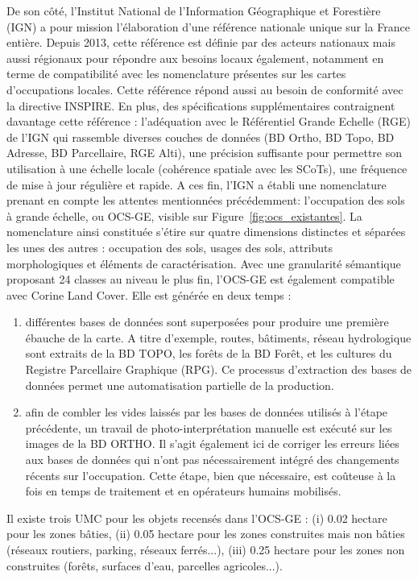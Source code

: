 De son côté, l'Institut National de l'Information Géographique et Forestière (IGN) a pour mission l'élaboration d'une référence nationale unique sur la France entière. Depuis 2013, cette référence est définie par des acteurs nationaux mais aussi régionaux pour répondre aux besoins locaux également, notamment en terme de compatibilité avec les nomenclature présentes sur les cartes d'occupations locales. Cette référence répond aussi au besoin de conformité avec la directive INSPIRE. En plus, des spécifications supplémentaires contraignent davantage cette référence : l'adéquation avec le Référentiel Grande Echelle (RGE) de l'IGN qui rassemble diverses couches de données (BD Ortho, BD Topo, BD Adresse, BD Parcellaire, RGE Alti), une précision suffisante pour permettre son utilisation à une échelle locale (cohérence spatiale avec les SCoTs), une fréquence de mise à jour régulière et rapide. A ces fin, l'IGN a établi une nomenclature prenant en compte les attentes mentionnées précédemment: l'occupation des sols à grande échelle, ou OCS-GE, visible sur Figure~\ref{fig:ocs_existantes}. La nomenclature ainsi constituée s'étire sur quatre dimensions distinctes et séparées les unes des autres : occupation des sols, usages des sols, attributs morphologiques et éléments de caractérisation. Avec une granularité sémantique proposant 24 classes au niveau le plus fin, l'OCS-GE est également compatible avec Corine Land Cover. Elle est générée en deux temps :
\begin{enumerate}
    \item différentes bases de données sont superposées pour produire une première ébauche de la carte. A titre d'exemple, routes, bâtiments, réseau hydrologique sont extraits de la BD TOPO\textregistered, les forêts de la BD Forêt\textregistered, et les cultures du Registre Parcellaire Graphique (RPG). Ce processus d'extraction des bases de données permet une automatisation partielle de la production.
    \item afin de combler les vides laissés par les bases de données utilisés à l'étape précédente, un travail de photo-interprétation manuelle est exécuté sur les images de la BD ORTHO\textregistered. Il s'agit également ici de corriger les erreurs liées aux bases de données qui n'ont pas nécessairement intégré des changements récents sur l'occupation. Cette étape, bien que nécessaire, est coûteuse à la fois en temps de traitement et en opérateurs humains mobilisés.
\end{enumerate}
Il existe trois UMC pour les objets recensés dans l'OCS-GE : (i) 0.02 hectare pour les zones bâties, (ii) 0.05 hectare pour les zones construites mais non bâties (réseaux routiers, parking, réseaux ferrés...), (iii) 0.25 hectare pour les zones non construites (forêts, surfaces d'eau, parcelles agricoles...).

